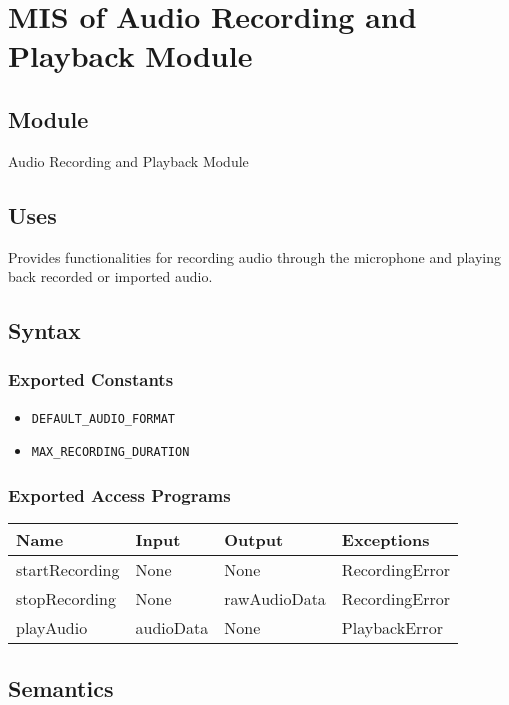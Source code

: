\documentclass[12pt, titlepage]{article}
\begin{document}
\section{MIS of Audio Recording and Playback Module} \label{M7}  

\subsection{Module}  
Audio Recording and Playback Module  

\subsection{Uses}  
Provides functionalities for recording audio through the microphone and playing back recorded or imported audio.  

\subsection{Syntax}  

\subsubsection{Exported Constants}  
\begin{itemize}
    \item \texttt{DEFAULT\_AUDIO\_FORMAT}  
    \item \texttt{MAX\_RECORDING\_DURATION}  
\end{itemize}  

\subsubsection{Exported Access Programs}  
\begin{center}  
\begin{tabular}{|p{3cm}|p{4cm}|p{4cm}|p{3cm}|}  
\hline  
\textbf{Name} & \textbf{Input} & \textbf{Output} & \textbf{Exceptions} \\  
\hline  
startRecording & None & None & RecordingError \\  
stopRecording & None & rawAudioData & RecordingError \\  
playAudio & audioData & None & PlaybackError \\  
\hline  
\end{tabular}  
\end{center}  

\subsection{Semantics}  
\end{document}
